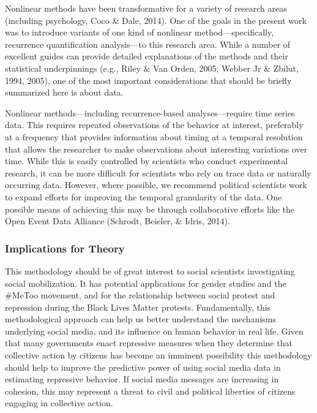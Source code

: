 \documentclass[english,man]{apa6}
\begin{document}
Nonlinear methods have been transformative for a variety of research
areas (including psychology, Coco \& Dale, 2014). One of the goals in the
present work was to introduce variants of one kind of nonlinear
method---specifically, recurrence quantification analysis---to
this research area. While a number of excellent guides can provide
detailed explanations of the methods and their statistical underpinnings
(e.g., Riley \& Van Orden, 2005; Webber Jr \& Zbilut, 1994, 2005),
one of the most important considerations that should be briefly
summarized here is about data.

Nonlinear methods---including recurrence-based analyses---require
time series data. This requires repeated observations of the behavior
at interest, preferably at a frequency that provides information
about timing at a temporal resolution that allows the researcher to
make observations about interesting variations over time. While
this is easily controlled by scientists who conduct experimental
research, it can be more difficult for scientists who rely on
trace data or naturally occurring data. However, where possible,
we recommend political scientists work to expand efforts for
improving the temporal granularity of the data. One possible
means of achieving this may be through collaborative efforts
like the Open Event Data Alliance (Schrodt, Beieler, \& Idris, 2014).

\hypertarget{implications-for-theory}{%
\subsubsection{Implications for Theory}\label{implications-for-theory}}

This methodology should be of great interest to social scientists investigating social mobilization. It has potential applications for gender studies and the \#MeToo movement, and for the relationship between social protest and repression during the Black Lives Matter protests. Fundamentally, this methodological approach can help us better understand the mechanisms underlying social media, and its influence on human behavior in real life. Given that many governments enact repressive measures when they determine that collective action by citizens has become an imminent possibility this methodology should help to improve the predictive power of using social media data in estimating repressive behavior. If social media messages are increasing in cohesion, this may represent a threat to civil and political liberties of citizens engaging in collective action.
\end{document}
